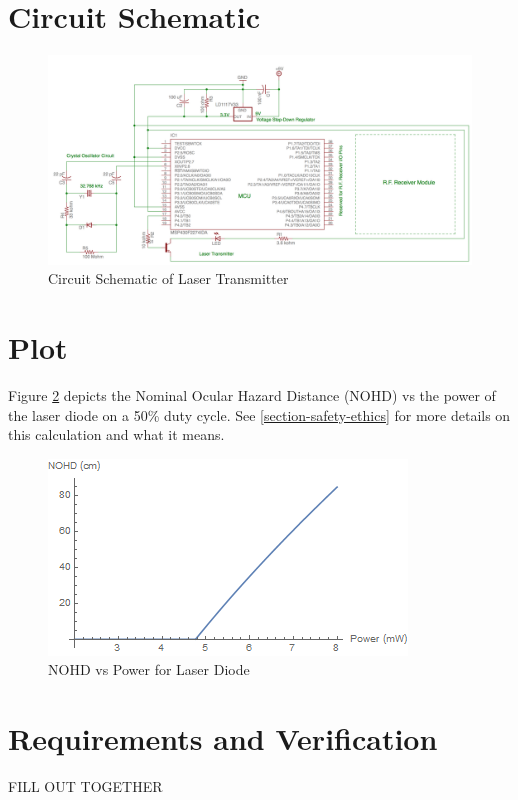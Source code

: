 \documentclass[openbib,letterpaper,10pt]{article}
\begin{document}
\begin{spacing}{1.15}
\section{Circuit Schematic}
\begin{figure} [H]
	\centering
	\includegraphics[scale=0.38]{Circuit_Schematic.png}
	\caption{Circuit Schematic of Laser Transmitter\label{fig:circuit-schematic}}
\end{figure}

\section{Plot}
Figure \ref{fig:nohdplot} depicts the Nominal Ocular Hazard Distance (NOHD) vs the power of the laser diode on a 50\% duty cycle. See \ref{section-safety-ethics} for more details on this calculation and what it means. 
\begin{figure} [H]
	\centering
	\includegraphics[scale=0.70]{NOHDvsPower.png}
	\caption{NOHD vs Power for Laser Diode\label{fig:nohdplot}}
\end{figure}

\section{Requirements and Verification}
FILL OUT TOGETHER


\end{spacing}
\end{document}
